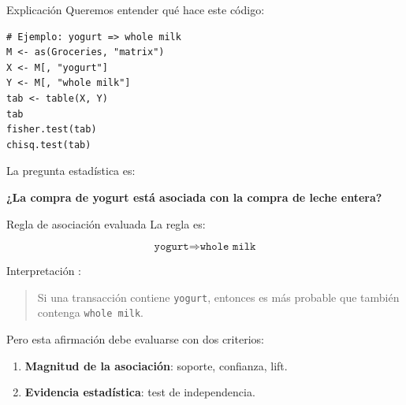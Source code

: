 \documentclass[10pt,aspectratio=169]{beamer}
\begin{document}
\begin{frame}[fragile]{Explicación}
\Large
Queremos entender qué hace este código:

\vspace{0.4cm}
\begin{lstlisting}[style=Rstyle]
# Ejemplo: yogurt => whole milk
M <- as(Groceries, "matrix")
X <- M[, "yogurt"]
Y <- M[, "whole milk"]
tab <- table(X, Y)
tab
fisher.test(tab)
chisq.test(tab)
\end{lstlisting}

\vspace{0.3cm}
\normalsize
La pregunta estadística es:

\begin{center}
\textbf{¿La compra de yogurt está asociada con la compra de leche entera?}
\end{center}
\end{frame}

\begin{frame}{Regla de asociación evaluada}
\Large
La regla es:

\[
\texttt{yogurt} \Rightarrow \texttt{whole milk}
\]

\vspace{0.3cm}
\normalsize
Interpretación :

\begin{quote}
Si una transacción contiene \texttt{yogurt}, entonces es más probable que también contenga \texttt{whole milk}.
\end{quote}

\vspace{0.3cm}
Pero esta afirmación debe evaluarse con dos criterios:

\begin{enumerate}
  \item \textbf{Magnitud de la asociación}: soporte, confianza, lift.
  \item \textbf{Evidencia estadística}: test de independencia.
\end{enumerate}
\end{frame}
\end{document}
